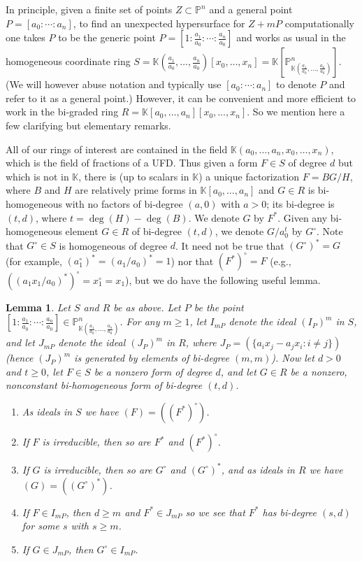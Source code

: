 \documentclass[12pt]{amsart}
\numberwithin{equation}{section}
\newtheorem{lemma}[theorem]{Lemma}
\theoremstyle{definition}
\newcommand{\PP}{ \ensuremath{\mathbb{P}}}
\newcommand{\KK}{ \ensuremath{\mathbb{K}}}
\begin{document}
In principle, given a finite set of points $Z\subset\PP^n$ and a general point $P=[a_0:\cdots:a_n]$,
to find an unexpected hypersurface for $Z+mP$ computationally one takes $P$ to be the generic point
$P=[1:\frac{a_1}{a_0}:\cdots:\frac{a_n}{a_0}]$ and works as usual in the homogeneous coordinate ring
$S=\KK(\frac{a_1}{a_0},\ldots,\frac{a_n}{a_0})[x_0,\ldots,x_n]=
\KK[\PP^n_{\KK(\frac{a_1}{a_0},\ldots,\frac{a_n}{a_0})}]$. 
(We will however abuse notation and typically use $[a_0:\cdots:a_n]$ to denote $P$
and refer to it as a general point.) However, it can be convenient
and more efficient to work in the bi-graded ring $R=\KK[a_0,\ldots,a_n][x_0,\ldots,x_n]$. So we mention here a few 
clarifying but elementary remarks.

All of our rings of interest are contained in the field $\KK(a_0,\ldots,a_n, x_0,\ldots,x_n)$, which is the field of fractions
of a UFD. Thus given a form $F\in S$ of degree $d$ but which is not in $\KK$,
there is (up to scalars in $\KK$) a unique factorization $F=BG/H$, where $B$ and $H$ are relatively prime forms in $\KK[a_0,\ldots,a_n]$ and 
$G\in R$ is bi-homogeneous with no factors of bi-degree $(a,0)$ with $a>0$; its bi-degree is $(t,d)$, where $t=\deg(H)-\deg(B)$. 
We denote $G$ by $F^*$. Given any bi-homogeneous element $G\in R$ of bi-degree $(t,d)$,
we denote $G/a_0^t$ by $G^\circ$. Note that $G^\circ\in S$ is homogeneous
of degree $d$. It need not be true that $(G^\circ)^*=G$ (for example, $(a_1^\circ)^*=(a_1/a_0)^*=1$) nor that
$(F^*)^\circ=F$ (e.g., $((a_1x_1/a_0)^*)^\circ=x_1^\circ=x_1$), but we do have the following useful lemma.

\begin{lemma}\label{StEx} 
Let $S$ and $R$ be as above.
Let $P$ be the point $[1:\frac{a_1}{a_0}:\cdots:\frac{a_n}{a_0}] \in\PP^n_{\KK(\frac{a_1}{a_0},\ldots,\frac{a_n}{a_0})}$.
For any $m \geq 1$, let $I_{mP}$ denote the ideal $(I_P)^m$ in $S$,
and let $J_{mP}$ denote the ideal $(J_P)^m$ in $R$,
where $J_P=(\{a_ix_j-a_jx_i: i\neq j\})$ (hence $(J_P)^m$ is generated by elements of bi-degree $(m,m)$).
Now let $d>0$ and $t \geq 0$, let $F\in S$ be a nonzero form of degree $d$,
and let $G\in R$ be a nonzero, nonconstant bi-homogeneous form of bi-degree $(t,d)$.

\begin{enumerate}
\item[(a)] As ideals in $S$ we have $(F)=((F^*)^\circ)$. 
\item[(b)] If $F$ is irreducible, then so are $F^*$ and $(F^*)^\circ$.
\item[(c)] If $G$ is irreducible, then so are $G^\circ$ and $(G^\circ)^*$, and as ideals in $R$ we have $(G)=((G^\circ)^*)$. 
\item[(d)] If $F\in I_{mP}$, then $d\geq m$ and 
$F^*\in J_{mP}$ so we see that $F^*$ has bi-degree $(s,d)$ for some $s$ with $s\geq m$. 
\item[(e)] If $G\in J_{mP}$, then $G^\circ\in I_{mP}$.
\end{enumerate}
\end{lemma}
\end{document}
